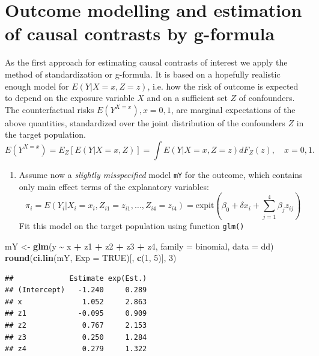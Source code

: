 \documentclass[
]{book}
\newenvironment{Shaded}{\begin{snugshade}}{\end{snugshade}}
\newcommand{\AttributeTok}[1]{\textcolor[rgb]{0.13,0.29,0.53}{#1}}
\newcommand{\ConstantTok}[1]{\textcolor[rgb]{0.56,0.35,0.01}{#1}}
\newcommand{\DecValTok}[1]{\textcolor[rgb]{0.00,0.00,0.81}{#1}}
\newcommand{\FunctionTok}[1]{\textcolor[rgb]{0.13,0.29,0.53}{\textbf{#1}}}
\newcommand{\NormalTok}[1]{#1}
\newcommand{\OtherTok}[1]{\textcolor[rgb]{0.56,0.35,0.01}{#1}}
\newcommand{\SpecialCharTok}[1]{\textcolor[rgb]{0.81,0.36,0.00}{\textbf{#1}}}
\providecommand{\tightlist}{%
  \setlength{\itemsep}{0pt}\setlength{\parskip}{0pt}}
\begin{document}
\section{Outcome modelling and estimation of causal contrasts by g-formula}\label{outcome-modelling-and-estimation-of-causal-contrasts-by-g-formula}

As the first approach for estimating causal contrasts of interest
we apply the method of standardization or g-formula. It is
based on a hopefully realistic enough model for
\(E(Y|X=x, Z=z)\), i.e.
how the risk of outcome is
expected to depend on the exposure variable \(X\) and
on a sufficient set \(Z\) of confounders. The counterfactual
risks \(E(Y^{X=x}), x=0,1\), are marginal expectations
of the above quantities, standardized over the joint
distribution of the confounders \(Z\) in the target population.
\[ E(Y^{X=x}) = E_Z[E(Y|X=x,Z)]
       = \int E(Y|X=x, Z=z)dF_Z(z), \quad x=0,1. \]

\begin{enumerate}
\def\labelenumi{\arabic{enumi}.}
\tightlist
\item
  Assume now a \emph{slightly misspecified} model \texttt{mY}
  for the outcome,
  which contains only main effect terms of the explanatory variables:
  \[ \pi_i = E(Y_i|X_i=x_i, Z_{i1}=z_{i1}, \dots, Z_{i4}=z_{i4}) =
    \text{expit}\left(\beta_0 + \delta x_i +
    \sum_{j=1}^4 \beta_j z_{ij} \right) \]
  Fit this model on the target population using function \texttt{glm()}
\end{enumerate}

\begin{Shaded}
\begin{Highlighting}[]
\NormalTok{mY }\OtherTok{\textless{}{-}} \FunctionTok{glm}\NormalTok{(y }\SpecialCharTok{\textasciitilde{}}\NormalTok{ x }\SpecialCharTok{+}\NormalTok{ z1 }\SpecialCharTok{+}\NormalTok{ z2 }\SpecialCharTok{+}\NormalTok{ z3 }\SpecialCharTok{+}\NormalTok{ z4, }\AttributeTok{family =}\NormalTok{ binomial, }\AttributeTok{data =}\NormalTok{ dd)}
\FunctionTok{round}\NormalTok{(}\FunctionTok{ci.lin}\NormalTok{(mY, }\AttributeTok{Exp =} \ConstantTok{TRUE}\NormalTok{)[, }\FunctionTok{c}\NormalTok{(}\DecValTok{1}\NormalTok{, }\DecValTok{5}\NormalTok{)], }\DecValTok{3}\NormalTok{)}
\end{Highlighting}
\end{Shaded}

\begin{verbatim}
##             Estimate exp(Est.)
## (Intercept)   -1.240     0.289
## x              1.052     2.863
## z1            -0.095     0.909
## z2             0.767     2.153
## z3             0.250     1.284
## z4             0.279     1.322
\end{verbatim}
\end{document}

